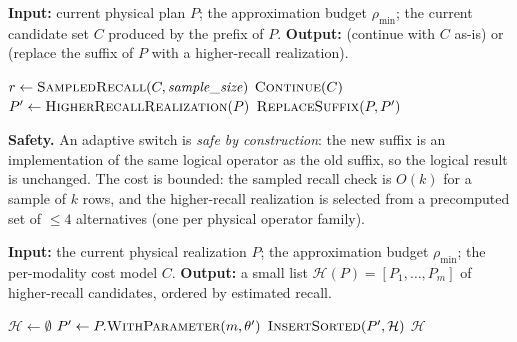 \documentclass[sigconf,nonacm,review]{acmart}
\theoremstyle{plain}
\theoremstyle{definition}
\theoremstyle{remark}
\begin{document}
\begin{algorithm}[t]
\caption{Adaptive re-planning at a plan point (B).}\label{alg:adaptive}
\textbf{Input:} current physical plan $P$; the approximation
budget $\rho_{\min}$; the current candidate set $C$ produced
by the prefix of $P$.
\textbf{Output:} (continue with $C$ as-is) or (replace the
suffix of $P$ with a higher-recall realization).
\begin{algorithmic}[1]
  \State $r \gets \Call{SampledRecall}{C, \mathit{sample\_size}}$
    \State \Return $\Call{Continue}{C}$
  \EndIf
  \State $P' \gets \Call{HigherRecallRealization}{P}$
  \State \Return $\Call{ReplaceSuffix}{P, P'}$
\end{algorithmic}
\end{algorithm}

\noindent\textbf{Safety.} An adaptive switch is \emph{safe by
construction}: the new suffix is an implementation of the same
logical operator as the old suffix, so the logical result is
unchanged. The cost is bounded: the sampled recall check is $O(k)$
for a sample of $k$ rows, and the higher-recall realization is
selected from a precomputed set of $\leq 4$ alternatives (one per
physical operator family).

\begin{algorithm}[t]
\caption{Higher-recall realization precomputation (called by Algorithm~\ref{alg:adaptive}).}\label{alg:fallback}
\textbf{Input:} the current physical realization
$P$; the approximation budget $\rho_{\min}$;
the per-modality cost model $C$.
\textbf{Output:} a small list
$\mathcal{H}(P) = [P_1, \ldots, P_m]$ of higher-recall
candidates, ordered by estimated recall.
\begin{algorithmic}[1]
  \State $\mathcal{H} \gets \emptyset$
      \State $P' \gets P.\Call{WithParameter}{m, \theta'}$
        \State $\Call{InsertSorted}{P', \mathcal{H}}$
      \EndIf
    \EndFor
  \EndFor
    \State {}
  \EndIf
  \State \Return $\mathcal{H}$
\end{algorithmic}
\end{algorithm}
\end{document}
